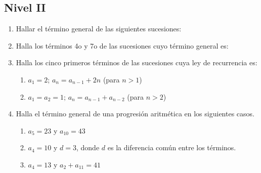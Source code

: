 \documentclass[10pt,twoside]{article}
\begin{document}
\subsection*{Nivel II}
\begin{enumerate}
\item Hallar el término general de las siguientes sucesiones:
\begin{enumerate}
\end{enumerate}
\item Halla los términos 4o y 7o de las sucesiones cuyo término general es:
\begin{enumerate}
\end{enumerate}
\item Halla los cinco primeros términos de las sucesiones cuya ley de recurrencia es:
\begin{enumerate}
\item $a_{1}=2$; $a_{n}=a_{n-1}+2n$ (para $n>1$)
\item $a_{1}=a_{2}=1$; $a_{n}=a_{n-1}+a_{n-2}$ (para $n>2$)
\end{enumerate}
\item Halla el término general de una progresión aritmética en los siguientes casos.
\begin{enumerate}
\item $a_{5}=23$ y $a_{10}=43$
\item $a_{4}=10$ y $d=3$, donde $d$ es la diferencia común entre los términos.
\item $a_{4}=13$ y $a_{2}+a_{11}=41$

\end{enumerate}
\end{enumerate}
\end{document}
